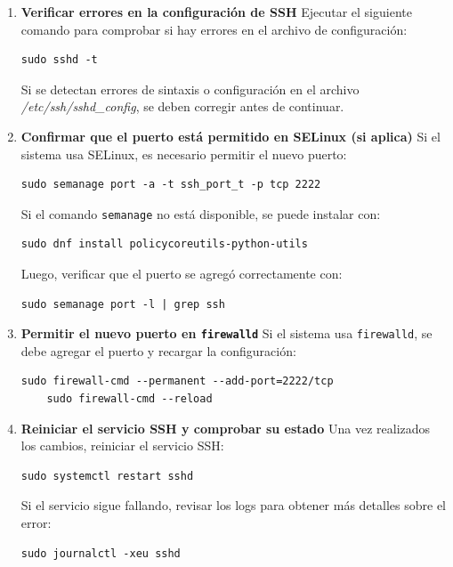 \begin{enumerate}
    \item \textbf{Verificar errores en la configuración de SSH}  
    Ejecutar el siguiente comando para comprobar si hay errores en el archivo de configuración:

    \begin{lstlisting}[style=mystyle]
    sudo sshd -t
    \end{lstlisting}

    Si se detectan errores de sintaxis o configuración en el archivo \textit{/etc/ssh/sshd\_config}, se deben corregir antes de continuar.

    \item \textbf{Confirmar que el puerto está permitido en SELinux (si aplica)}  
    Si el sistema usa SELinux, es necesario permitir el nuevo puerto:

    \begin{lstlisting}[style=mystyle]
    sudo semanage port -a -t ssh_port_t -p tcp 2222
    \end{lstlisting}

    Si el comando \texttt{semanage} no está disponible, se puede instalar con:

    \begin{lstlisting}[style=mystyle]
    sudo dnf install policycoreutils-python-utils
    \end{lstlisting}

    Luego, verificar que el puerto se agregó correctamente con:

    \begin{lstlisting}[style=mystyle]
    sudo semanage port -l | grep ssh
    \end{lstlisting}

    \item \textbf{Permitir el nuevo puerto en \texttt{firewalld}}  
    Si el sistema usa \texttt{firewalld}, se debe agregar el puerto y recargar la configuración:

    \begin{lstlisting}[style=mystyle]
    sudo firewall-cmd --permanent --add-port=2222/tcp
    sudo firewall-cmd --reload
    \end{lstlisting}

    \item \textbf{Reiniciar el servicio SSH y comprobar su estado}  
    Una vez realizados los cambios, reiniciar el servicio SSH:

    \begin{lstlisting}[style=mystyle]
    sudo systemctl restart sshd
    \end{lstlisting}

    Si el servicio sigue fallando, revisar los logs para obtener más detalles sobre el error:

    \begin{lstlisting}[style=mystyle]
    sudo journalctl -xeu sshd
    \end{lstlisting}
\end{enumerate}

